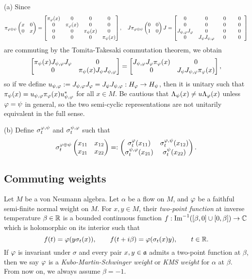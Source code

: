 \documentclass{../../small}
\begin{document}
\begin{pf}
(a)
Since
\[\pi_{\f\oplus\psi}\mat{x&0\\0&x}=\mat[b]{
\pi_\f(x)&0&0&0\\
0&\pi_\f(x)&0&0\\
0&0&\pi_\psi(x)&0\\
0&0&0&\pi_\psi(x)},\quad
J\pi_{\f\oplus\psi}\mat{0&0\\1&0}J=\mat[b]{
0&0&\ \ 0\ \ &\ \ 0\ \ \\
0&0&0&0\\
J_{\psi,\f}J_\f&0&0&0\\
0&J_\psi J_{\psi,\f}&0&0}\]
are commuting by the Tomita-Takesaki commutation theorem, we obtain
\[\mat[b]{\pi_\psi(x)J_{\psi,\f}J_\f&0\\0&\pi_\psi(x)J_\psi J_{\psi,\f}}=\mat[b]{J_{\psi,\f}J_\f\pi_\f(x)&0\\0&J_\psi J_{\psi,\f}\pi_\f(x)},\]
so if we define $u_{\psi,\f}:=J_{\psi,\f}J_\f=J_\psi J_{\psi,\f}:H_\f\to H_\psi$, then it is unitary such that $\pi_\psi(x)=u_{\psi,\f}\pi_\f(x)u_{\psi,\f}^*$ for all $x\in M$.
Be cautious that $\Lambda_\psi(x)\ne u\Lambda_\f(x)$ unless $\f=\psi$ in general, so the two semi-cyclic representations are not unitarily equivalent in the full sense.

(b)
Define $\sigma_t^{\f,\psi}$ and $\sigma_t^{\psi,\f}$ such that
\[\sigma_t^{\f\oplus\psi}\mat{x_{11}&x_{12}\\x_{21}&x_{22}}=:\mat{\sigma_t^\f(x_{11})&\sigma_t^{\f,\psi}(x_{12})\\\sigma_t^{\psi,\f}(x_{21})&\sigma_t^\psi(x_{22})}.\]

\end{pf}



\subsection{Commuting weights}


\begin{defn}
Let $M$ be a von Neumann algebra.
Let $\alpha$ be a flow on $M$, and $\f$ be a faithful semi-finite normal weight on $M$.
For $x,y\in M$, their \emph{two-point function} at inverse temperature $\beta\in\R$ is a bounded continuous function $f:\Im^{-1}([\beta,0]\cup[0,\beta])\to\C$ which is holomorphic on its interior such that
\[f(t)=\f(y\sigma_t(x)),\qquad f(t+i\beta)=\f(\sigma_t(x)y),\qquad t\in\R.\]
If $\f$ is invariant under $\sigma$ and every pair $x,y\in\fa$ admits a two-point function at $\beta$, then we say $\f$ is a \emph{Kubo-Martin-Schwinger weight} or \emph{KMS weight} for $\alpha$ at $\beta$.
From now on, we always assume $\beta=-1$.
\end{defn}
\end{document}
